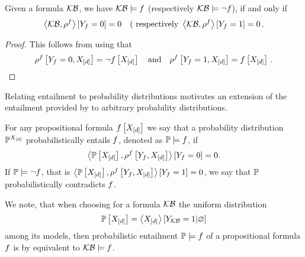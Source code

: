 \begin{theorem}
    Given a formula $\mathcal{KB}$, we have $\mathcal{KB}\models f$ (respectively $\mathcal{KB}\models\lnot f$), if and only if
    \begin{align*}
        \left\langle \mathcal{KB},\rho^{f}\right\rangle \left[ Y_{f}=0 \right] = 0
        \quad \text{( respectively }
        \left\langle \mathcal{KB},\rho^{f}\right\rangle \left[ Y_{f}=1 \right] = 0 \, .
    \end{align*}
\end{theorem}
\begin{proof}
    This follows from  using that
    \begin{align*}
        \rho^{f}\left[Y_{f}=0,X_{[d]}\right] = \lnot f\left[X_{[d]}\right] \quad \text{and} \quad \rho^{f}\left[Y_{f}=1,X_{[d]}\right] = f\left[X_{[d]}\right] \, .
    \end{align*}
\end{proof}


%
Relating entailment to probability distributions motivates an extension of the entailment provided by  to arbitrary probability distributions.

\begin{definition}
    \label{def:probEntailment}
    For any propositional formula $f\left[X_{[d]}\right]$ we say that a probability distribution $\mathbb{P}^{X_{[d]}}$ probabilistically entails $f$, denoted as $\mathbb{P}\models f$, if
    \begin{align*}
        \left\langle \mathbb{P}\left[X_{[d]}\right],\rho^{f}\left[Y_{f},X_{[d]}\right]\right\rangle \left[ Y_{f}=0 \right] = 0 .
    \end{align*}
    If $\mathbb{P}\models\lnot f$, that is $\left\langle \mathbb{P}\left[X_{[d]}\right],\rho^{f}\left[Y_{f},X_{[d]}\right]\right\rangle \left[ Y_{f}=1 \right] = 0$, we say that $\mathbb{P}$ probabilistically contradicts $f$.
\end{definition}

%
We note, that when choosing for a formula $\mathcal{KB}$ the uniform distribution
\begin{align*}
    \mathbb{P}\left[X_{[d]}\right]=\left\langle X_{[d]}\right\rangle \left[ Y_{\mathcal{KB}}=1 | \varnothing \right]
\end{align*}
among its models, then probabilistic entailment $\mathbb{P}\models f$ of a propositional formula $f$ is by  equivalent to $\mathcal{KB}\models f$.

